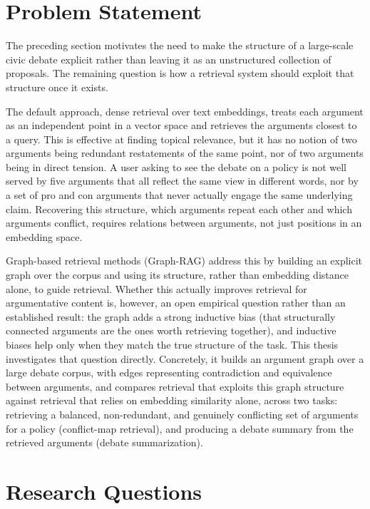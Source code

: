 \section{Problem Statement}
\label{sec:problem}

The preceding section motivates the need to make the structure of a large-scale civic debate
explicit rather than leaving it as an unstructured collection of proposals. The remaining
question is how a retrieval system should exploit that structure once it exists.

The default approach, dense retrieval over text embeddings, treats each argument as an
independent point in a vector space and retrieves the arguments closest to a query. This is
effective at finding topical relevance, but it has no notion of two arguments being redundant
restatements of the same point, nor of two arguments being in direct tension. A user asking to
see the debate on a policy is not well served by five arguments that all reflect the same view
in different words, nor by a set of pro and con arguments that never actually engage the same
underlying claim. Recovering this structure, which arguments repeat each other and which
arguments conflict, requires relations between arguments, not just positions in an embedding
space.

Graph-based retrieval methods (Graph-RAG) address this by building an explicit graph over the
corpus and using its structure, rather than embedding distance alone, to guide retrieval. Whether
this actually improves retrieval for argumentative content is, however, an open empirical
question rather than an established result: the graph adds a strong inductive bias (that
structurally connected arguments are the ones worth retrieving together), and inductive biases
help only when they match the true structure of the task. This thesis investigates that question
directly. Concretely, it builds an argument graph over a large debate corpus, with edges
representing contradiction and equivalence between arguments, and compares retrieval that
exploits this graph structure against retrieval that relies on embedding similarity alone, across
two tasks: retrieving a balanced, non-redundant, and genuinely conflicting set of arguments for a
policy (conflict-map retrieval), and producing a debate summary from the retrieved arguments
(debate summarization).

\section{Research Questions}
\label{sec:rq}

